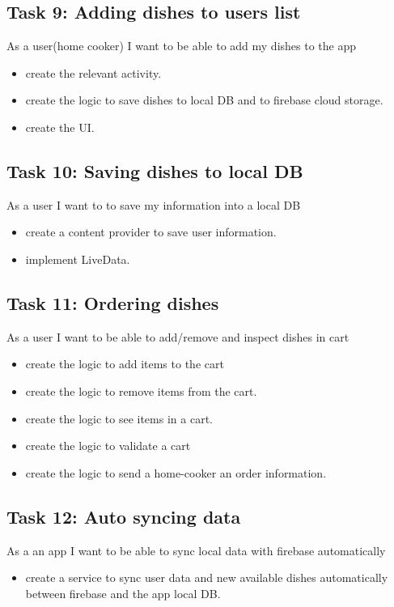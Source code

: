 \documentclass{article}
\begin{document}
\subsection{Task 9: Adding dishes to users list}
	As a user(home cooker) I want to be able to add my dishes to the app
  \begin{itemize}
	  \item create the relevant activity.
    \item create the logic to save dishes to local DB and to firebase cloud storage.
    \item create the UI.
  \end{itemize}

\subsection{Task 10: Saving dishes to local DB}
	As a user I want to to save my information into a local DB
  \begin{itemize}
    \item create a content provider to save user information.
    \item implement LiveData.
  \end{itemize}

\subsection{Task 11: Ordering dishes}
	As a user I want to be able to add/remove and inspect dishes in cart
  \begin{itemize}
    \item  create the logic to add items to the cart
    \item create the logic to remove items from the cart.
    \item create the logic to see items in a cart.
    \item create the logic to validate a cart
    \item create the logic to send a home-cooker an order information.
  \end{itemize}

\subsection{Task 12: Auto syncing data}
As a an app I want to be able to sync local data with firebase automatically 
  \begin{itemize}
    \item create a service to sync user data and new available dishes automatically between firebase and the app local DB.
  \end{itemize}
\end{document}

